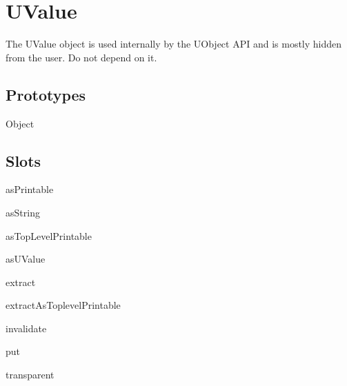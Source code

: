 
\section{UValue}


The UValue object is used internally by the UObject API and is mostly
hidden from the user.  Do not depend on it.


\subsection{Prototypes}

\begin{refObjects}
\item[Object]
\end{refObjects}

\subsection{Slots}

\begin{urbiscriptapi}
\item[asPrintable]


\item[asString]


\item[asTopLevelPrintable]


\item[asUValue]


\item[extract]


\item[extractAsToplevelPrintable]


\item[invalidate]


\item[put]


\item[transparent]
\end{urbiscriptapi}

